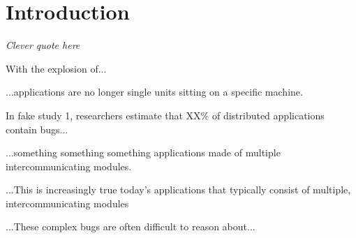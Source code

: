 \section{Introduction}
\label{SEC:introduction}

\textit{Clever quote here}

With the explosion of...

...applications are no longer single units sitting on a specific machine.

In fake study 1, researchers estimate that XX\% of distributed applications
contain bugs...



...something something something applications made of multiple
intercommunicating modules.


...This is increasingly true today's applications that typically consist of
multiple, intercommunicating modules


...These complex bugs are often difficult to reason about...




